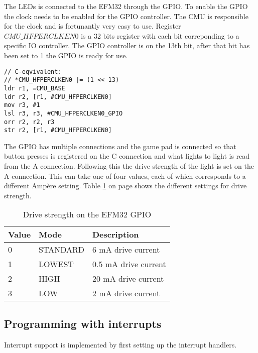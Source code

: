 The LEDs is connected to the EFM32 through the GPIO. To enable the GPIO the clock needs to be enabled for the GPIO controller. The CMU is responsible for the clock and is fortunantly very easy to use. Register $CMU\_HFPERCLKEN0$ is a 32 bits register with each bit correponding to a specific IO controller. The GPIO controller is on the 13th bit, after that bit has been set to 1 the GPIO is ready for use.

\begin{lstlisting}
// C-eqvivalent:
// *CMU_HFPERCLKEN0 |= (1 << 13)
ldr r1, =CMU_BASE
ldr r2, [r1, #CMU_HFPERCLKEN0]
mov r3, #1
lsl r3, r3, #CMU_HFPERCLKEN0_GPIO
orr r2, r2, r3
str r2, [r1, #CMU_HFPERCLKEN0]
\end{lstlisting}

The GPIO has multiple connections and the game pad is connected so that button presses is registered on the C connection and what lights to light is read from the A connection. Following this the drive strength of the light is set on the A connection. This can take one of four values, each of which corresponds to a different Ampère setting. Table \ref{tab:drive_strength} on page \pageref{tab:drive_strength} shows the different settings for drive strength.

\begin{table}
    \begin{center}
    \begin{tabular}{| l | l | l |}
        \hline
        Value   & Mode      & Description \\
        \hline
        0       & STANDARD  & 6 mA drive current \\
        \hline
        1       & LOWEST    & 0.5 mA drive current \\
        \hline
        2       & HIGH      & 20 mA drive current \\
        \hline
        3       & LOW       & 2 mA drive current \\
        \hline
    \end{tabular}
    \caption{Drive strength on the EFM32 GPIO}
    \label{tab:drive_strength}
    \end{center}
\end{table}

\subsection{Programming with interrupts}
\label{subsec:dev_pros_interrupts}

Interrupt support is implemented by first setting up the interrupt handlers.


